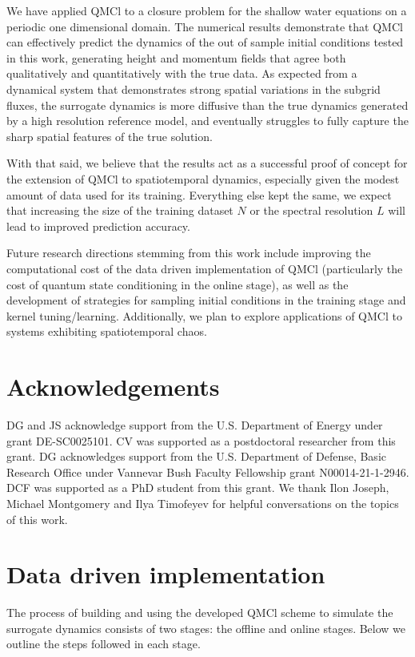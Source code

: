 \documentclass[letterpaper,10pt,3p,preprint]{elsarticle}
\begin{document}
We have applied QMCl to a closure problem for the shallow water
equations on a periodic one dimensional domain.
The numerical results demonstrate that QMCl can effectively
predict the dynamics of the out of sample initial conditions
tested in this work, generating height and momentum fields that
agree both qualitatively and quantitatively with the true
data.
As expected from a dynamical system that demonstrates strong
spatial variations in the subgrid fluxes, the surrogate dynamics is
more diffusive than the true dynamics generated by a high
resolution reference model,
and eventually struggles to fully capture the sharp spatial features
of the true solution.

With that said, we believe that the results act as a successful proof of
concept for the extension of QMCl to spatiotemporal dynamics,
especially given the modest amount of data used for its training.
Everything else kept the same, we expect that increasing the
size of the training dataset $N$ or the spectral resolution $L$
will lead to improved prediction accuracy.

Future research directions stemming from this work include
improving the computational cost of the data driven implementation
of QMCl (particularly the cost of quantum state conditioning in the
online stage), as well as the development of strategies for
sampling initial conditions in the training stage and
kernel tuning/learning.
Additionally, we plan to explore applications of QMCl to systems
exhibiting spatiotemporal chaos.


\section*{Acknowledgements}
DG and JS acknowledge support from the U.S.
Department of Energy under grant DE-SC0025101.
CV was supported as a postdoctoral researcher from this grant.
DG acknowledges support from the U.S. Department of Defense,
Basic Research Office under Vannevar Bush Faculty Fellowship
grant N00014-21-1-2946.
DCF was supported as a PhD student from this grant.
We thank Ilon Joseph, Michael Montgomery and Ilya Timofeyev
for helpful conversations on the topics of this work.

\appendix
\section{Data driven implementation}\label{app:implementation}
The process of building and using the developed QMCl scheme to simulate
the surrogate dynamics consists of two stages:
the offline and online stages.
Below we outline the steps followed in each stage.
\end{document}
